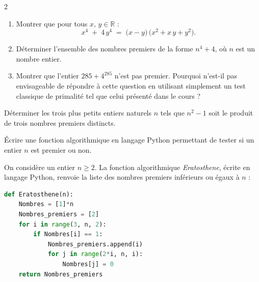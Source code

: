 \documentclass[a4paper,12pt]{article}
\begin{document}
\begin{multicols}{2}
\begin{exercice}[title=Exercice 11 $\star\star\star$ { [Calculer] }]{}{}
  \begin{enumerate}
    \item Montrer que pour tous \(x,\,y \in \mathbb{R}\) :
      \[
        x^4 \;+\; 4\,y^4 \;=\; \bigl(x - y\bigr)\,\bigl(x^2 + x\,y + y^2\bigr).
      \]
    \item Déterminer l'ensemble des nombres premiers de la forme \(n^4 + 4\), où \(n\) est un nombre entier.
    \item Montrer que l'entier \(285 + 4^{285}\) n'est pas premier.
      Pourquoi n'est-il pas envisageable de répondre à cette question en utilisant simplement un test classique de primalité tel que celui présenté dans le cours ?
  \end{enumerate}
\end{exercice}

\begin{exercice}[title=Exercice 12 $\star\star$ { [Chercher] }]{}{}
  Déterminer les trois plus petits entiers naturels \(n\) tels que \(n^2 - 1\) soit le produit de trois nombres premiers distincts.
\end{exercice}

\begin{exercice}[title=Exercice 13 $\star$ { [Représenter] }]{}{}
  Écrire une fonction algorithmique en langage Python permettant de tester si un entier \(n\) est premier ou non.
\end{exercice}

\begin{exercice}[title=Exercice 14 $\star\star\star$ { [Modéliser, Représenter] }]{}{}
  On considère un entier $n \ge 2$. La fonction algorithmique \emph{Eratosthene}, écrite en langage Python, renvoie la liste des nombres premiers inférieurs ou égaux à $n$ :

    \begin{lstlisting}[language=Python]
def Eratosthene(n):
    Nombres = [1]*n
    Nombres_premiers = [2]
    for i in range(3, n, 2):
        if Nombres[i] == 1:
            Nombres_premiers.append(i)
            for j in range(2*i, n, i):
                Nombres[j] = 0
    return Nombres_premiers
    \end{lstlisting}


\end{exercice}
\end{multicols}
\end{document}
